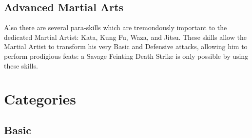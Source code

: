 \documentclass[twoside]{book}
\begin{document}
\subsection{Advanced Martial Arts}
    
    {  
      Also there are several para-skills which are
               tremondously important to the dedicated Martial Artist:
               Kata, Kung Fu, Waza, and Jitsu. These skills allow the
               Martial Artist to transform his very Basic and Defensive
               attacks, allowing him to perform prodigious feats: a
               Savage Feinting Death Strike is only possible by using
               these skills. 
    }
  
    

\section{Categories}
    
    

\subsection{Basic}
    
\end{document}
